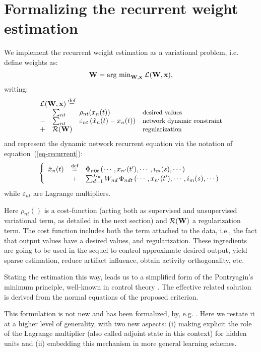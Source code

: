 \section*{Formalizing the recurrent weight estimation}

We implement the recurrent weight estimation as a variational problem, i.e. define weights as: \begin{equation}\label{eq-criterion} {\bf W} = \mbox{arg min}_{{\bf W} , {\bf x}} \; {\cal L}({\bf W} , {\bf x}) ,\end{equation}
writing:
\[ \begin{array}{clll} \multicolumn{3}{l}{{\cal L}({\bf W} , {\bf x}) \deq} \\
& \sum_{nt} & \rho_{nt}(x_n(t)) & \mbox{\small desired values} \\
-& \sum_{nt} & \varepsilon_{nt} \, (\hat{x}_n(t) - x_n(t)) & \mbox{\small network dynamic constraint} \\
+& {\cal R}({\bf W}) & & \mbox{\small regularization} \\
\end{array} \]
and represent the dynamic network recurrent equation via the notation of equation~(\ref{eq-recurrent}):
 \[ \left\{ \begin{array}{rcl}
\hat{x}_n(t) &\stackrel {\rm def}{=}& \Phi_{n0t}\left(\cdots, x_{n'}(t'), \cdots, i_{m}(s), \cdots\right) \\
 &+& \sum_{d = 1}^{D_{n}} W_{nd} \, \Phi_{ndt}\left(\cdots, x_{n'}(t'), \cdots, i_{m}(s), \cdots\right)
\end{array} \right. \]
while $\varepsilon_{nt}$ are Lagrange multipliers.

Here $\rho_{nt}()$ is a cost-function (acting both as supervised and unsupervised variational term, as detailed in the next section) and ${\cal R}({\bf W})$ a regularization term. The cost function includes both the term attached to the data, i.e., the fact that output values have a desired values, and regularization. These ingredients are going to be used in the sequel to control approximate desired output, yield sparse estimation, reduce artifact influence, obtain activity orthogonality, etc.

Stating the estimation this way, leads us to a simplified form of the Pontryagin's minimum principle, well-known in control theory \cite{astrom:83}. The effective related solution is derived from the normal equations of the proposed criterion.

This formulation is not new and has been formalized, by, e.g. \cite{cun_theoretical_1988}. Here we restate it at a higher level of generality, with two new aspects: (i) making explicit the role of the Lagrange multiplier (also called adjoint state in this context) for hidden units and (ii) embedding this mechanism in more general learning schemes.

